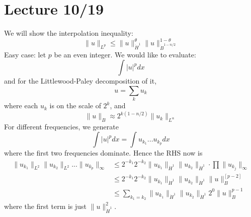 \section{Lecture 10/19}

We will show the interpolation inequality:
\begin{equation*}
    \|u\|_{L^p}\leq\|u\|_{\dot{H}^1}^\theta\|u\|_{\dot{B}^{1-n/2}}^{1-\theta}
\end{equation*}
Easy case: let $p$ be an even integer.
We would like to evaluate: 
\begin{equation*}
    \int |u|^p dx
\end{equation*}
and for the Littlewood-Paley decomposition of it,
\begin{equation*}
    u=\sum_k u_k
\end{equation*}
where each $u_k$ is on the scale of $2^k$, and 
\begin{equation*}
    \|u\|_B\approx 2^{k(1-n/2)}\|u_k\|_{L^\alpha}
\end{equation*}
For different frequencies, we generate
\begin{equation*}
    \int |u|^pdx=\int u_{k_1}...u_{k_p}dx
\end{equation*}
where the first two frequencies dominate. Hence the RHS now is
\begin{align*}
    \|u_{k_1}\|_{L^2}\|u_{k_2}\|_{L^2}...\|u_{k_p}\|_\infty&\leq 2^{-k_1}2^{-k_2}\|u_{k_1}\|_{\dot{H}^1}\|u_{k_2}\|_{\dot{H}^1}\cdot\prod\|u_{k_j}\|_\infty\\
    &\leq 2^{-k_1}2^{-k_2}\|u_{k_1}\|_{\dot{H}^1}\|u_{k_2}\|_{\dot{H}^1}\|u\|_B^[p-2]\\
    &\leq\sum_{k_1=k_2}\|u_{k_1}\|_{\dot{H}^1}\|u_{k_2}\|_{\dot{H}^1}2^0\|u\|_B^{p-1}
\end{align*}
where the first term is just $\|u\|_{\dot{H}^1}^2$.

